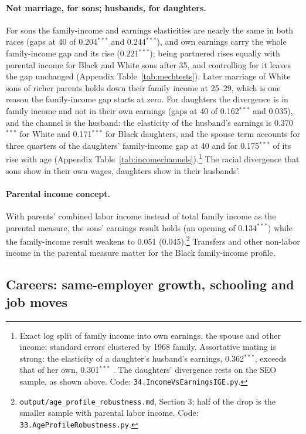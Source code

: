 \paragraph{Not marriage, for sons; husbands, for daughters.} For sons the family-income and earnings elasticities are
nearly the same in both races (gaps at 40 of 0.204$^{***}$ and 0.244$^{***}$), and own earnings carry the whole
family-income gap and its rise (0.221$^{***}$); being partnered rises equally with parental income for Black and White
sons after 35, and controlling for it leaves the gap unchanged (Appendix Table~\ref{tab:mechtests}). Later marriage of White
sons of richer parents holds down their family income at 25--29, which is one reason the family-income gap starts at
zero. For daughters the divergence is in family income and not in their own earnings (gaps at 40 of 0.162$^{***}$ and
0.035), and the channel is the husband: the elasticity of the husband's earnings is 0.370$^{***}$ for White and
0.171$^{***}$ for Black daughters, and the spouse term accounts for three quarters of the daughters' family-income gap
at 40 and for 0.175$^{***}$ of its rise with age (Appendix Table~\ref{tab:incomechannels}).\footnote{Exact log split of family
income into own earnings, the spouse and other income; standard errors clustered by 1968 family. Assortative mating is
strong: the elasticity of a daughter's husband's earnings, 0.362$^{***}$, exceeds that of her own, 0.301$^{***}$
\citep[as in][]{chadwick2002intergenerational}. The daughters' divergence rests on the SEO sample, as
shown above. Code: \texttt{34.IncomeVsEarningsIGE.py}.} The racial divergence that sons show in
their own wages, daughters show in their husbands'.


\paragraph{Parental income concept.} With parents' combined labor income instead of total family income as the
parental measure, the sons' earnings result holds (an opening of 0.134$^{***}$) while the family-income result weakens
to 0.051 (0.045).\footnote{\texttt{output/age\_profile\_robustness.md}, Section 3; half of the drop is the smaller
sample with parental labor income. Code: \texttt{33.AgeProfileRobustness.py}.} Transfers and other non-labor
income in the parental measure matter for the Black family-income profile.


\subsection{Careers: same-employer growth, schooling and job moves}\label{sec:careers}

